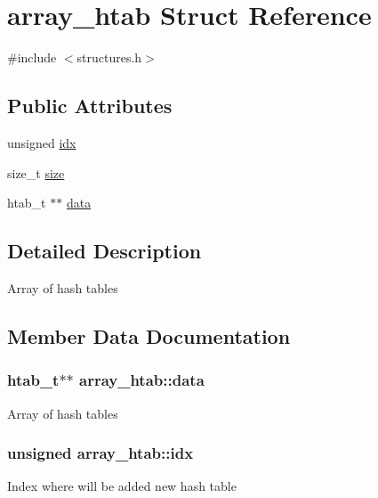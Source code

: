 \hypertarget{structarray__htab}{}\section{array\+\_\+htab Struct Reference}
\label{structarray__htab}


{\ttfamily \#include $<$structures.\+h$>$}

\subsection*{Public Attributes}
\begin{DoxyCompactItemize}
\item 
unsigned \hyperlink{structarray__htab_afd9eaf3820cafa19b1605f4779707121}{idx}
\item 
size\+\_\+t \hyperlink{structarray__htab_a63abd88a74d355292833e33b5a6b1a72}{size}
\item 
htab\+\_\+t $\ast$$\ast$ \hyperlink{structarray__htab_a001618dfa51bc6f8099502658c152a1a}{data}
\end{DoxyCompactItemize}


\subsection{Detailed Description}
Array of hash tables 

\subsection{Member Data Documentation}
\subsubsection[{\texorpdfstring{data}{data}}]{\setlength{\rightskip}{0pt plus 5cm}htab\+\_\+t$\ast$$\ast$ array\+\_\+htab\+::data}\hypertarget{structarray__htab_a001618dfa51bc6f8099502658c152a1a}{}\label{structarray__htab_a001618dfa51bc6f8099502658c152a1a}
Array of hash tables 
\subsubsection[{\texorpdfstring{idx}{idx}}]{\setlength{\rightskip}{0pt plus 5cm}unsigned array\+\_\+htab\+::idx}\hypertarget{structarray__htab_afd9eaf3820cafa19b1605f4779707121}{}\label{structarray__htab_afd9eaf3820cafa19b1605f4779707121}
Index where will be added new hash table 
